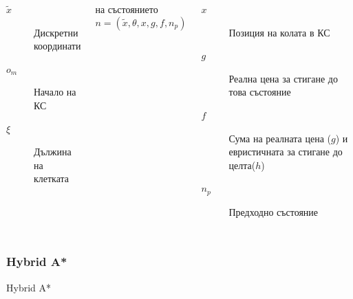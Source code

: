 \documentclass[hyperref=unicode]{beamer}
\begin{document}
\begin{frame}
\begin{columns}
      \begin{flushleft}
      \tiny\begin{description}
          \item[$\widetilde{x}$]{Дискретни координати}
          \item[$o_m$]{Начало на КС}
          \item[$\xi$]{Дължина на клетката}
        \end{description}
      \end{flushleft}
      \tiny\begin{alertblock}{ на състоянието}
        \begin{equation*}
          n = \left(\widetilde{x},\theta,x,g,f,n_p\right)
        \end{equation*}
      \end{alertblock}
      \begin{description}
        \item[$x$]{Позиция на колата в КС}
        \item[$g$]{Реална цена за стигане до това състояние}
        \item[$f$]{Сума на реалната цена ($g$) и евристичната за стигане до целта($h$)}
        \item[$n_p$]{Предходно състояние}
      \end{description}
      \end{columns}
    \end{frame}
    \begin{frame}
      \frametitle{Hybrid A*}
      \begin{algorithm}[H]
        \caption{Hybrid A*}\label{has}
        \begin{algorithmic}[1]
              \EndIf
            \EndWhile
          \EndProcedure
        \end{algorithmic}
      \end{algorithm}
    \end{frame}
\end{document}

